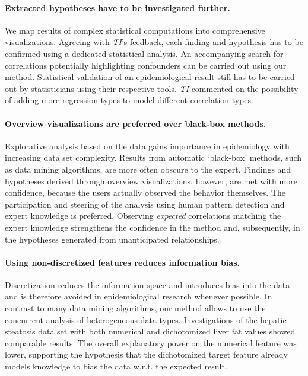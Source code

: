 \documentclass[journal]{style/vgtc} 			          %
\begin{document}
\paragraph{Extracted hypotheses have to be investigated further.}
We map results of complex statistical computations into comprehensive visualizations.
Agreeing with \emph{TI}'s feedback, each finding and hypothesis has to be confirmed using a dedicated statistical analysis.
An accompanying search for correlations potentially highlighting confounders can be carried out using our method.
Statistical validation of an epidemiological result still has to be carried out by statisticians using their respective tools.
\emph{TI} commented on the possibility of adding more regression types to model different correlation types.%

\paragraph{Overview visualizations are preferred over black-box methods.}
Explorative analysis based on the data gains importance in epidemiology with increasing data set complexity.
Results from automatic `black-box' methods, such as data mining algorithms, are more often obscure to the expert.
Findings and hypotheses derived through overview visualizations, however, are met with more confidence, because the users actually observed the behavior themselves.
The participation and steering of the analysis using human pattern detection and expert knowledge is preferred.
Observing \emph{expected} correlations matching the expert knowledge strengthens the confidence in the method and, subsequently, in the hypotheses generated from unanticipated relationships.

\paragraph{Using non-discretized features reduces information bias.}
Discretization reduces the information space and introduces bias into the data and is therefore avoided in epidemiological research whenever possible.
In contrast to many data mining algorithms, our method allows to use the concurrent analysis of heterogeneous data types.
Investigations of the hepatic steatosis data set with both numerical and dichotomized liver fat values showed comparable results. %
The overall explanatory power on the numerical feature was lower, supporting the hypothesis that the dichotomized target feature already models knowledge to bias the data w.r.t. the expected result.
\end{document}
